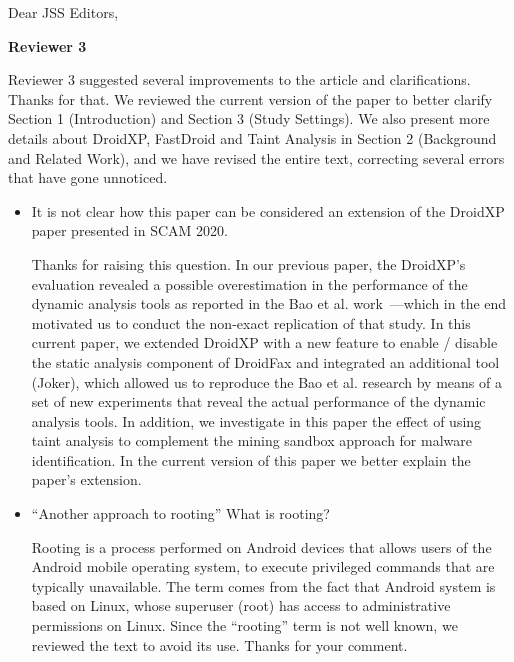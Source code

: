 \documentclass[12pt,english]{scrartcl}
\begin{document}
\begin{letter}{Dear JSS Editors,}
\begin{itemize}
\end{itemize}

{\bf Reviewer 3}

 {\color{blue}{\bf Answer.} Reviewer 3 suggested several improvements to the article and clarifications. Thanks for that. We reviewed the current version of the paper to better clarify Section 1 (Introduction) and Section 3 (Study Settings). We also present more details about DroidXP, FastDroid and Taint Analysis in Section 2 (Background and Related Work), and we have revised the entire text, correcting several errors that have gone unnoticed.}

\begin{itemize}

\item It is not clear how this paper can be considered an extension of the DroidXP paper presented in SCAM 2020.

\vspace{0.2cm}

{\color{blue}{\bf Answer.} Thanks for raising this question. In our previous paper,
  the DroidXP's evaluation revealed a possible
overestimation in the performance of the dynamic analysis tools as
reported in the Bao et al. work~\cite{DBLP:conf/wcre/BaoLL18}---which in the end motivated us to
conduct the non-exact replication of that study. In this current paper, 
we extended DroidXP with a new feature to enable / disable the
static analysis component of DroidFax and integrated an additional
tool (Joker), which allowed us
to reproduce the Bao et al. research by means of a set of new experiments
that reveal the actual performance of the dynamic analysis tools.
In addition, we investigate in this paper the effect of using
taint analysis to complement the mining sandbox approach for
malware identification. In the current version of this paper
we better explain the paper's extension.}

\vspace{0.2cm}

\item ``Another approach to rooting'' What is rooting?

\vspace{0.2cm}

{\color{blue}{\bf Answer.} Rooting is a process performed on Android devices that allows
  users of the Android mobile operating system, to execute privileged commands that are typically unavailable.
  The term comes from the fact that Android system is based on Linux, whose superuser (root) has access to administrative permissions on Linux. Since the ``rooting'' term is not well known, we reviewed the text to avoid its use. Thanks for your comment. }


\end{itemize}
\end{letter}
\end{document}
